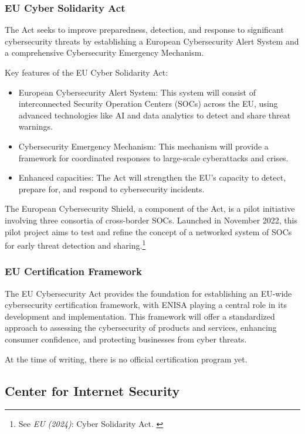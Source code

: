 \subsubsection{EU Cyber Solidarity Act}

The Act seeks to improve preparedness, detection, and response to significant cybersecurity threats by establishing a European Cybersecurity Alert System and a comprehensive Cybersecurity Emergency Mechanism.

Key features of the EU Cyber Solidarity Act:

\begin{itemize}
    \item European Cybersecurity Alert System: This system will consist of interconnected Security Operation Centers (SOCs) across the EU, using advanced technologies like AI and data analytics to detect and share threat warnings.
    \item Cybersecurity Emergency Mechanism: This mechanism will provide a framework for coordinated responses to large-scale cyberattacks and crises.
    \item Enhanced capacities: The Act will strengthen the EU's capacity to detect, prepare for, and respond to cybersecurity incidents.
\end{itemize}

The European Cybersecurity Shield, a component of the Act, is a pilot initiative involving three consortia of cross-border SOCs. Launched in November 2022, this pilot project aims to test and refine the concept of a networked system of SOCs for early threat detection and sharing.\footnote{See \textit{EU (2024)}: Cyber Solidarity Act. \cite{cyberSol}}

\subsubsection{EU Certification Framework}

The EU Cybersecurity Act provides the foundation for establishing an EU-wide cybersecurity certification framework, with ENISA playing a central role in its development and implementation. This framework will offer a standardized approach to assessing the cybersecurity of products and services, enhancing consumer confidence, and protecting businesses from cyber threats.

At the time of writing, there is no official certification program yet.

\subsection{Center for Internet Security}

